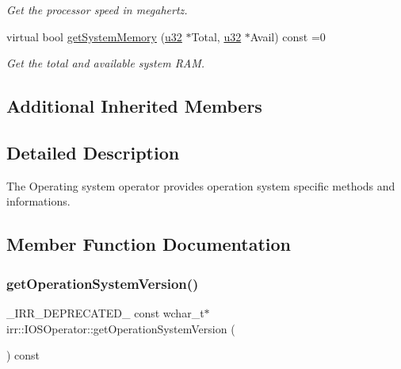 \begin{DoxyCompactItemize}
\begin{DoxyCompactList}\small\item\em Get the processor speed in megahertz. \end{DoxyCompactList}\item 
virtual bool \hyperlink{classirr_1_1IOSOperator_af58b50cecf28f247e1f302ee0b9e8270}{get\+System\+Memory} (\hyperlink{namespaceirr_a0416a53257075833e7002efd0a18e804}{u32} $\ast$Total, \hyperlink{namespaceirr_a0416a53257075833e7002efd0a18e804}{u32} $\ast$Avail) const =0
\begin{DoxyCompactList}\small\item\em Get the total and available system R\+AM. \end{DoxyCompactList}\end{DoxyCompactItemize}
\subsection*{Additional Inherited Members}


\subsection{Detailed Description}
The Operating system operator provides operation system specific methods and informations. 

\subsection{Member Function Documentation}
\mbox{\label{classirr_1_1IOSOperator_a8d634ee79439742b7397ca7ad7a3812a}} 
\subsubsection{\texorpdfstring{get\+Operation\+System\+Version()}{getOperationSystemVersion()}}
{\footnotesize\ttfamily \+\_\+\+I\+R\+R\+\_\+\+D\+E\+P\+R\+E\+C\+A\+T\+E\+D\+\_\+ const wchar\+\_\+t$\ast$ irr\+::\+I\+O\+S\+Operator\+::get\+Operation\+System\+Version (\begin{DoxyParamCaption}{ }\end{DoxyParamCaption}) const\hspace{0.3cm}{\ttfamily [inline]}}



